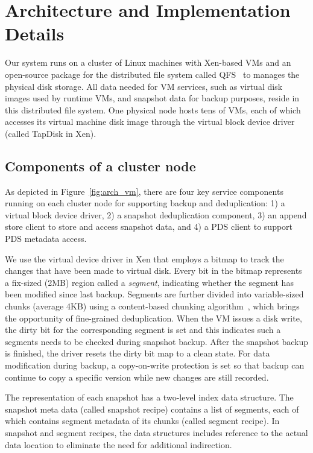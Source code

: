 \section{Architecture and Implementation Details}
\label{sect:architecture}

Our system runs on a cluster of Linux machines with Xen-based VMs and
an open-source package for the distributed file system  called QFS~\cite{QFS} to 
manages  the physical disk storage. 
All data needed for VM services, such as virtual disk images used by runtime VMs,
and snapshot data for backup purposes, reside in this distributed file system. 
One physical node hosts tens of VMs, each of which accesses its virtual machine disk image through the
virtual block device driver (called TapDisk\cite{Warfield2005} in Xen).

\subsection{ Components of a cluster node } 
As depicted in Figure~\ref{fig:arch_vm}, 
there are four key service components running on each cluster
node  for supporting backup and deduplication: 
1) a virtual block device driver, 2) a snapshot deduplication component,
3) an append store client to store  and access snapshot data,
and 4)  a PDS client to support PDS metadata access. 

We use the virtual device driver in Xen that employs a bitmap to track the changes 
that have been made to virtual disk.
Every bit in the bitmap represents a fix-sized (2MB) region called a \textit{segment}, indicating whether the segment
has been modified since last backup. 
Segments are further divided into variable-sized chunks (average 4KB) 
using a content-based chunking algorithm~\cite{frame05}, 
which brings the opportunity of fine-grained deduplication.
When the VM issues a disk write, the dirty bit for the corresponding segment is set
and this indicates such a segments needs to be checked during snapshot backup. 
After the snapshot backup is finished, the driver resets the dirty bit map to a clean state.
For data modification during backup, a copy-on-write protection is set so that backup can continue to
copy  a specific version while new changes are still recorded.

The representation of each snapshot has  a two-level index data structure.
The snapshot meta data (called snapshot recipe) contains a list of segments, each of which contains segment
metadata of its chunks (called segment recipe).
In snapshot and segment recipes, 
the data structures  includes reference to the actual data location to eliminate the need for additional indirection.

